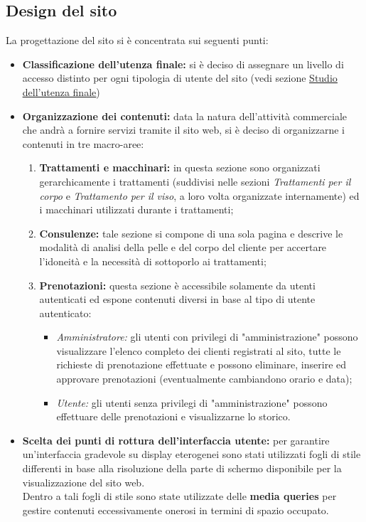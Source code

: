 \documentclass[]{article}
\begin{document}
\subsection{Design del sito}
La progettazione del sito si è concentrata sui seguenti punti:
	\begin{itemize}
		\item \textbf{Classificazione dell'utenza finale:} si è deciso di assegnare un livello di accesso distinto per ogni tipologia di utente del sito (vedi sezione \hyperref[analisi:utenza]{\underline{Studio dell'utenza finale}}) 
		\item \textbf{Organizzazione dei contenuti:} data la natura dell'attività commerciale che andrà a fornire servizi tramite il sito web, si è deciso di organizzarne i contenuti in tre macro-aree:
			\begin{enumerate}
				\item \textbf{Trattamenti e macchinari:} in questa sezione sono organizzati gerarchicamente i trattamenti (suddivisi nelle sezioni \textit{Trattamenti per il corpo} e \textit{Trattamento per il viso}, a loro volta organizzate internamente) ed i macchinari utilizzati durante i trattamenti;
				\item \textbf{Consulenze:} tale sezione si compone di una sola pagina e descrive le modalità di analisi della pelle e del corpo del cliente per accertare l'idoneità e la necessità di sottoporlo ai trattamenti;
				\item \textbf{Prenotazioni:} questa sezione è accessibile solamente da utenti autenticati ed espone contenuti diversi in base al tipo di utente autenticato:
					\begin{itemize}
						\item \textit{Amministratore:} gli utenti con privilegi di "amministrazione" possono visualizzare l'elenco completo dei clienti registrati al sito, tutte le richieste di prenotazione effettuate e possono eliminare, inserire ed approvare prenotazioni (eventualmente cambiandono orario e data);
						\item \textit{Utente:} gli utenti senza privilegi di "amministrazione" possono effettuare delle prenotazioni e visualizzarne lo storico.  
					\end{itemize}
			\end{enumerate} 
		\item \textbf{Scelta dei punti di rottura dell'interfaccia utente:} per garantire un'interfaccia gradevole su display eterogenei sono stati utilizzati fogli di stile differenti in base alla risoluzione della parte di schermo disponibile per la visualizzazione del sito web. \\
		 Dentro a tali fogli di stile sono state utilizzate delle \textbf{media queries} per gestire contenuti eccessivamente onerosi in termini di spazio occupato.
	\end{itemize}
\end{document}
